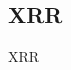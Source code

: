 \documentclass[\main/dresen_thesis.tex]{subfiles}
\begin{document}
  \subsection{XRR}
    \label{app:methods:xrr}
    XRR
\end{document}
